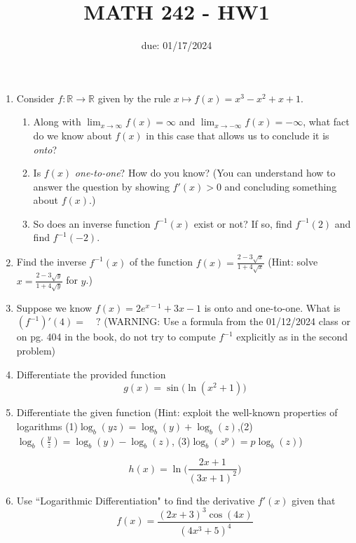 \documentclass[12pt]{article}
\title{MATH 242 - HW1}
\date{due: 01/17/2024}
\begin{document}
\maketitle


\begin{enumerate}

\item Consider $f:\mathbb{R}\to\mathbb{R}$ given by the rule $x\mapsto f(x)=x^3-x^2+x+1$. 

\begin{enumerate}
    \item Along with $\displaystyle\lim_{x\to\infty}f(x)=\infty$ and $\displaystyle\lim_{x\to-\infty}f(x)=-\infty$, what fact do we know about $f(x)$ in this case that allows us to conclude it is \emph{onto}?
    \vfill
    \item Is $f(x)$ \emph{one-to-one}? How do you know? (You can understand how to answer the question by showing $f'(x)>0$ and concluding something about $f(x)$.)
    \vfill
    \item So does an inverse function $f^{-1}(x)$ exist or not? If so, find $f^{-1}(2)$ and find $f^{-1}(-2)$.
\vspace{1.5cm}
\end{enumerate}

\pagebreak

\item Find the inverse $f^{-1}(x)$ of the function $f(x)=\frac{2-3\sqrt{x}}{1+4\sqrt{x}}$ (Hint: solve $x=\frac{2-3\sqrt{y}}{1+4\sqrt{y}}$ for $y$.)

\vfill

\item Suppose we know $f(x)=2e^{x-1}+3x-1$ is onto and one-to-one. What is $(f^{-1})'(4)=\quad ?$ (WARNING: Use a formula from the 01/12/2024 class or on pg. 404 in the book, do not try to compute $f^{-1}$ explicitly as in the second problem) 
\vfill


\pagebreak

\item Differentiate the provided function $$g(x)=\sin\Big(\ln(x^2+1)\Big)$$

\vfill


\item Differentiate the given function (Hint: exploit the well-known properties of logarithms (1)$\log_b{(yz)}=\log_b{(y)}+\log_b{(z)}$,(2)$\log_b{(\frac{y}{z})}=\log_b{(y)}-\log_b{(z)}$, (3)$\log_b{(z^p)}=p\log_b{(z)}$)


$$h(x)=\ln\Big(\frac{2x+1}{(3x+1)^2}\Big)$$

\vfill
\pagebreak

\item Use ``Logarithmic Differentiation" to find the derivative $f'(x)$ given that
$$f(x)=\frac{(2x+3)^3\cos(4x)}{(4x^3+5)^4}$$

\end{enumerate}
\end{document}
